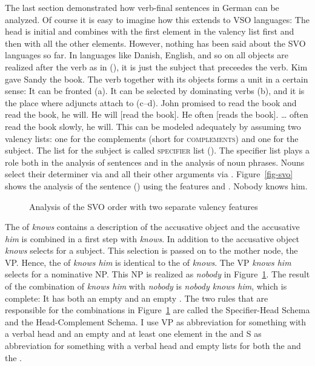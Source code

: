 The last section demonstrated how verb-final sentences in German can be analyzed. Of course it is
easy to imagine how this extends to VSO languages: The head is initial and combines with the first
element in the valency list first and then with all the other elements. However, nothing has been
said about the SVO languages so far. In languages like Danish, English, and so on all objects are
realized after the verb as in (), it is just the subject that preceedes the verb.
\ea
Kim gave Sandy the book.
\z
The verb together with its objects forms a unit in a certain sense: It can be fronted (a). It can be
selected by dominating verbs (b), and it is the place where adjuncts attach to (c--d).
\eal
\ex John promised to read the book and read the book, he will.
\ex He will [read the book].
\ex He often [reads the book].
\ex \ldots{} often read the book slowly, he will.
\zl
This can be modeled adequately by assuming two valency lists: one for the complements (\comps short for \textsc{complements}) and
one for the subject. The list for the subject is called \textsc{specifier} list (\spr{}). The specifier list
plays a role both in the analysis of sentences and in the analysis of noun phrases. Nouns
select their determiner via \spr and all their other arguments via \comps. Figure~\vref{fig-svo}
shows the analysis of the sentence () using the features \spr and \comps.
\ea
Nobody knows him.
\z
\begin{figure}
\caption{\label{fig-svo}Analysis of the SVO order with two separate valency features}
\end{figure}
The \compsl of \emph{knows} contains a description of the accusative object and the accusative
\emph{him} is combined in a first step with \emph{knows}. In addition to the accusative object
\emph{knows} selects for a subject. This selection is passed on to the mother node, the VP. Hence,
the \sprv of \emph{knows him} is identical to the \sprv of \emph{knows}. The VP \emph{knows him}
selects for a nominative NP. This NP is realized as \emph{nobody} in Figure~\ref{fig-svo}. The
result of the combination of \emph{knows him} with \emph{nobody} is \emph{nobody knows him}, which
is complete: It has both an empty \sprl and an empty \compsl. The two rules that are responsible for
the combinations in Figure~\ref{fig-svo} are called the Specifier-Head Schema and the
Head-Complement Schema. I use VP as abbreviation for something with a verbal head and an empty \compsl and at least
one element in the \sprl and S as abbreviation for something with a verbal head and empty lists for
both the \spr and the \compsv.

